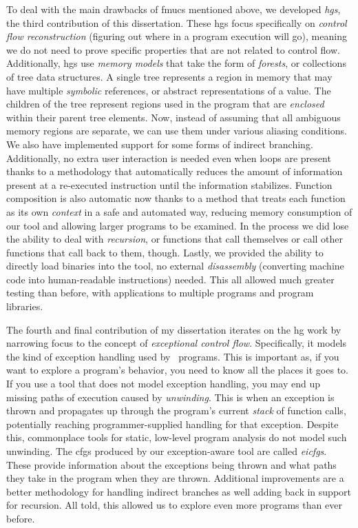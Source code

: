{  To deal with the main drawbacks of \acp{fmuc} mentioned above, we developed \emph{\acfp{hg}}, the third contribution of this dissertation.
  These \acp{hg} focus specifically on \emph{control flow reconstruction} (figuring out where in a program execution will go), meaning we do not need to prove specific properties that are not related to control flow.
  Additionally, \acp{hg} use \emph{memory models} that take the form of \emph{forests}, or collections of tree data structures.
  A single tree represents a region in memory that may have multiple \emph{symbolic} references, or abstract representations of a value.
  The children of the tree represent regions used in the program that are \emph{enclosed} within their parent tree elements.
  Now, instead of assuming that all ambiguous memory regions are separate, we can use them under various aliasing conditions.
  We also have implemented support for some forms of indirect branching.
  Additionally, no extra user interaction is needed even when loops are present thanks to a methodology that automatically reduces the amount of information present at a re-executed instruction until the information stabilizes.
  Function composition is also automatic now thanks to a method that treats each function as its own \emph{context} in a safe and automated way, reducing memory consumption of our tool and allowing larger programs to be examined.
  In the process we did lose the ability to deal with \emph{recursion}, or functions that call themselves or call other functions that call back to them, though.
  Lastly, we provided the ability to directly load binaries into the tool, no external \emph{disassembly} (converting machine code into human-readable instructions) needed.
  This all allowed much greater testing than before, with applications to multiple programs and program libraries.

  The fourth and final contribution of my dissertation iterates on the \ac{hg} work by narrowing focus to the concept of \emph{exceptional control flow}.
  Specifically, it models the kind of exception handling used by \Cpp\ programs.
  This is important as, if you want to explore a program's behavior, you need to know all the places it goes to.
  If you use a tool that does not model exception handling, you may end up missing paths of execution caused by \emph{unwinding}.
  This is when an exception is thrown and propagates up through the program's current \emph{stack} of function calls, potentially reaching programmer-supplied handling for that exception.
  Despite this, commonplace tools for static, low-level program analysis do not model such unwinding.
  The \acp{cfg} produced by our exception-aware tool are called \emph{\acfp{eicfg}}.
  These provide information about the exceptions being thrown and what paths they take in the program when they are thrown.
  Additional improvements are a better methodology for handling indirect branches as well adding back in support for recursion.
  All told, this allowed us to explore even more programs than ever before.
}
